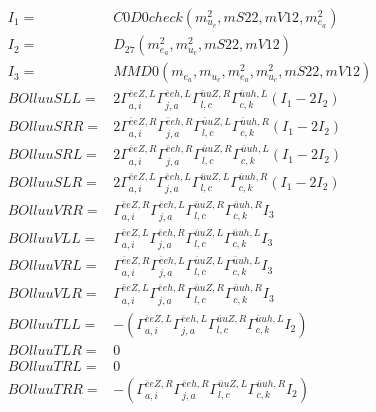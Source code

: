 \documentclass[A4,landscape]{article}
\begin{document}
\begin{align} 
I_1 = & C0D0check(m^2_{u_{{c}}}, mS22, mV12, m^2_{e_{{a}}}) \\ 
I_2 = & D_{27}(m^2_{e_{{a}}}, m^2_{u_{{c}}}, mS22, mV12) \\ 
I_3 = & MMD0(m_{e_{{a}}}, m_{u_{{c}}}, m^2_{e_{{a}}}, m^2_{u_{{c}}}, mS22, mV12) \\ 
  BOlluuSLL= & 2  \Gamma^{\bar{e}e Z ,L}_{a, i} \Gamma^{\bar{e}e h ,L}_{j, a} \Gamma^{\bar{u}u Z ,R}_{l, c} \Gamma^{\bar{u}u h ,L}_{c, k} (I_1 - 2 I_2) \\ 
  BOlluuSRR= & 2  \Gamma^{\bar{e}e Z ,R}_{a, i} \Gamma^{\bar{e}e h ,R}_{j, a} \Gamma^{\bar{u}u Z ,L}_{l, c} \Gamma^{\bar{u}u h ,R}_{c, k} (I_1 - 2 I_2) \\ 
  BOlluuSRL= & 2  \Gamma^{\bar{e}e Z ,R}_{a, i} \Gamma^{\bar{e}e h ,R}_{j, a} \Gamma^{\bar{u}u Z ,R}_{l, c} \Gamma^{\bar{u}u h ,L}_{c, k} (I_1 - 2 I_2) \\ 
  BOlluuSLR= & 2  \Gamma^{\bar{e}e Z ,L}_{a, i} \Gamma^{\bar{e}e h ,L}_{j, a} \Gamma^{\bar{u}u Z ,L}_{l, c} \Gamma^{\bar{u}u h ,R}_{c, k} (I_1 - 2 I_2) \\ 
  BOlluuVRR= &  \Gamma^{\bar{e}e Z ,R}_{a, i} \Gamma^{\bar{e}e h ,L}_{j, a} \Gamma^{\bar{u}u Z ,R}_{l, c} \Gamma^{\bar{u}u h ,R}_{c, k} I_3 \\ 
  BOlluuVLL= &  \Gamma^{\bar{e}e Z ,L}_{a, i} \Gamma^{\bar{e}e h ,R}_{j, a} \Gamma^{\bar{u}u Z ,L}_{l, c} \Gamma^{\bar{u}u h ,L}_{c, k} I_3 \\ 
  BOlluuVRL= &  \Gamma^{\bar{e}e Z ,R}_{a, i} \Gamma^{\bar{e}e h ,L}_{j, a} \Gamma^{\bar{u}u Z ,L}_{l, c} \Gamma^{\bar{u}u h ,L}_{c, k} I_3 \\ 
  BOlluuVLR= &  \Gamma^{\bar{e}e Z ,L}_{a, i} \Gamma^{\bar{e}e h ,R}_{j, a} \Gamma^{\bar{u}u Z ,R}_{l, c} \Gamma^{\bar{u}u h ,R}_{c, k} I_3 \\ 
  BOlluuTLL= & -( \Gamma^{\bar{e}e Z ,L}_{a, i} \Gamma^{\bar{e}e h ,L}_{j, a} \Gamma^{\bar{u}u Z ,R}_{l, c} \Gamma^{\bar{u}u h ,L}_{c, k} I_2) \\ 
  BOlluuTLR= & 0 \\ 
  BOlluuTRL= & 0 \\ 
  BOlluuTRR= & -( \Gamma^{\bar{e}e Z ,R}_{a, i} \Gamma^{\bar{e}e h ,R}_{j, a} \Gamma^{\bar{u}u Z ,L}_{l, c} \Gamma^{\bar{u}u h ,R}_{c, k} I_2) \\ 
\end{align} 
\end{document}
